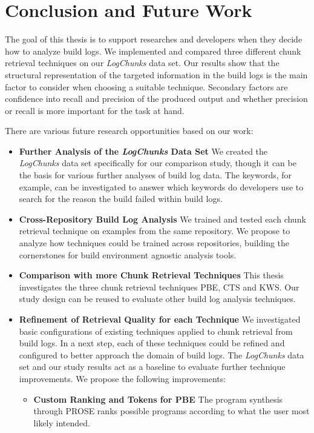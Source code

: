 \documentclass[\myrootdir/main.tex]{subfiles}
\begin{document}
\chapter{Conclusion and Future Work}
\label{sec:conclusion-fw}
The goal of this thesis is to support researches and developers when they decide how to analyze build logs.
We implemented and compared three different chunk retrieval techniques on our \emph{LogChunks} data set.
Our results show that the structural representation of the targeted information in the build logs is the main factor to consider when choosing a suitable technique.
Secondary factors are confidence into recall and precision of the produced output and whether precision or recall is more important for the task at hand.

There are various future research opportunities based on our work:
\begin{itemize}
  \item \textbf{Further Analysis of the \emph{LogChunks} Data Set} We created the \emph{LogChunks} data set specifically for our comparison study, though it can be the basis for various further analyses of build log data.
  The keywords, for example, can be investigated to answer which keywords do developers use to search for the reason the build failed within build logs.
  \item \textbf{Cross-Repository Build Log Analysis} We trained and tested each chunk retrieval technique on examples from the same repository.
  We propose to analyze how techniques could be trained across repositories, building the cornerstones for build environment agnostic analysis tools.
  \item \textbf{Comparison with more Chunk Retrieval Techniques} This thesis investigates the three chunk retrieval techniques PBE, CTS and KWS\@.
  Our study design can be reused to evaluate other build log analysis techniques.
  \item \textbf{Refinement of Retrieval Quality for each Technique} We investigated basic configurations of existing techniques applied to chunk retrieval from build logs.
  In a next step, each of these techniques could be refined and configured to better approach the domain of build logs.
  The \emph{LogChunks} data set and our study results act as a baseline to evaluate further technique improvements.
  We propose the following improvements:
    \begin{itemize}
      \item \textbf{Custom Ranking and Tokens for PBE} The program synthesis through PROSE ranks possible programs according to what the user most likely intended.

\end{itemize}
\end{itemize}
\end{document}
